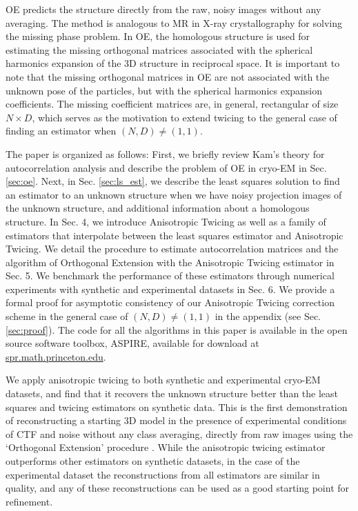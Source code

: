 OE predicts the structure directly from the raw, noisy images without any averaging. The method is analogous to MR in X-ray crystallography for solving the missing phase problem. In OE, the homologous structure is used for estimating the missing orthogonal matrices associated with the spherical harmonics expansion of the 3D structure in reciprocal space. It is 
important to note that the missing orthogonal matrices in OE are not 
associated with the unknown pose of the particles, but with the
spherical harmonics expansion coefficients. The
missing coefficient matrices are, in general, rectangular of size $N \times D$, 
which serves as the
motivation to extend twicing to the general case of finding an estimator when
$(N,D) \neq (1,1)$. 

The paper is
organized as follows: First, we briefly review Kam's theory for autocorrelation 
analysis and describe the problem of OE in
cryo-EM in Sec. \ref{sec:oe}. Next, in Sec. \ref{sec:ls_est}, we describe 
the least squares solution to find an estimator to an unknown structure 
when we have
noisy projection images of the unknown structure,
and additional information about a homologous structure. 
In Sec. 4, we introduce Anisotropic Twicing as well as a family of estimators that interpolate between the least squares estimator and Anisotropic Twicing. We detail the procedure to estimate autocorrelation matrices and the algorithm of Orthogonal Extension with the Anisotropic Twicing estimator in Sec. 5. We benchmark the performance of these estimators through numerical experiments with synthetic 
and experimental datasets in Sec. 6. We provide a formal proof for asymptotic consistency 
of our Anisotropic Twicing correction scheme in
the general case of $(N,D)\neq (1,1)$ in the appendix (see Sec. 
\ref{sec:proof}). The code for all the algorithms in this paper is available in 
the open source software toolbox, ASPIRE, available for download at 
\url{spr.math.princeton.edu}. 

We apply anisotropic twicing to both synthetic and experimental cryo-EM 
datasets, and find that it recovers the unknown structure better than the least 
squares and twicing estimators on synthetic data. This is the first 
demonstration of reconstructing a starting 3D model in the presence of 
experimental conditions of CTF and noise without any class averaging, directly 
from raw images using the `Orthogonal Extension' procedure \cite{Bhamre2014}. 
While the anisotropic 
twicing estimator outperforms other estimators on synthetic datasets, in the case of 
the experimental dataset the reconstructions from all estimators are 
similar in quality, and any of these reconstructions can be used as a good starting point for refinement.



